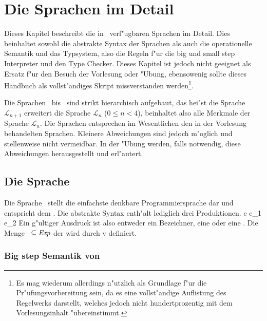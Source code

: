 
\chapter{Die Sprachen im Detail\label{DieSprachenImDetail}}

Dieses Kapitel beschreibt die in \TPML\ verf"ugbaren Sprachen im Detail. Dies beinhaltet sowohl die abstrakte Syntax der Sprachen als auch die
operationelle Semantik und das Typsystem, also die Regeln f"ur die big und small step Interpreter und den Type Checker. Dieses Kapitel ist
jedoch nicht geeignet als Ersatz f"ur den Besuch der Vorlesung oder "Ubung, ebensowenig sollte dieses Handbuch als vollst"andiges Skript
missverstanden werden\footnote{Es mag wiederum allerdings n"utzlich als Grundlage f"ur die Pr"ufungsvorbereitung sein, da es eine vollst"andige
Auflistung des Regelwerks darstellt, welches jedoch nicht hundertprozentig mit dem Vorlesungsinhalt "ubereinstimmt.}.

Die Sprachen \LZERO\ bis \LFOUR\ sind strikt hierarchisch aufgebaut, das hei"st die Sprache $\mathcal{L}_{n+1}$ erweitert die Sprache
$\mathcal{L}_n$ ($0 \le n < 4$), beinhaltet also alle Merkmale der Sprache $\mathcal{L}_n$. Die Sprachen entsprechen im Wesentlichen
den in der Vorlesung behandelten Sprachen. Kleinere Abweichungen sind jedoch m"oglich und stellenweise nicht vermeidbar. In der "Ubung
werden, falls notwendig, diese Abweichungen herausgestellt und erl"autert.



\section{Die Sprache \LZERO}

Die Sprache \LZERO\ stellt die einfachste denkbare Programmiersprache dar und entspricht dem  . Die abstrakte Syntax enth"alt lediglich drei Produktionen.
\bgram
e \is \id
  \al {}
  \al e_1\,e_2
\egram
Ein g"ultiger Ausdruck ist also entweder ein Bezeichner, eine  oder eine .
Die Menge \notation{$\Val$}\ $\subseteq {\text{\it Exp\/}}$ der    wird durch
\bgram
v \is \id
  \al {}
\egram
definiert.


\subsection{Big step Semantik von \LZERO}

